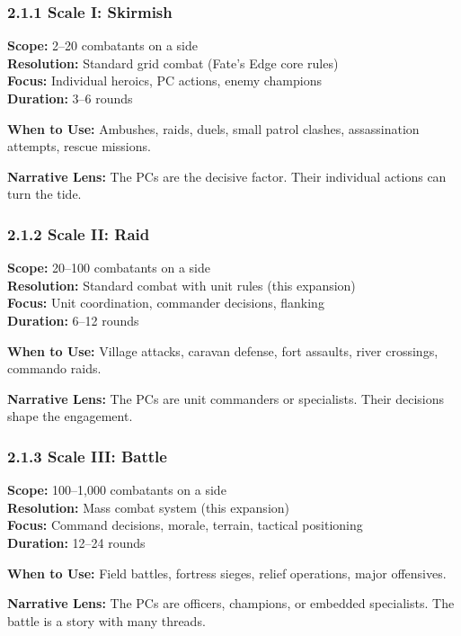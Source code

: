 \documentclass[11pt]{article}
\begin{document}
\subsubsection{2.1.1 Scale I: Skirmish}

\textbf{Scope:} 2–20 combatants on a side\\
\textbf{Resolution:} Standard grid combat (Fate's Edge core rules)\\
\textbf{Focus:} Individual heroics, PC actions, enemy champions\\
\textbf{Duration:} 3–6 rounds

\textbf{When to Use:} Ambushes, raids, duels, small patrol clashes, assassination attempts, rescue missions.

\textbf{Narrative Lens:} The PCs are the decisive factor. Their individual actions can turn the tide.

\subsubsection{2.1.2 Scale II: Raid}

\textbf{Scope:} 20–100 combatants on a side\\
\textbf{Resolution:} Standard combat with unit rules (this expansion)\\
\textbf{Focus:} Unit coordination, commander decisions, flanking\\
\textbf{Duration:} 6–12 rounds

\textbf{When to Use:} Village attacks, caravan defense, fort assaults, river crossings, commando raids.

\textbf{Narrative Lens:} The PCs are unit commanders or specialists. Their decisions shape the engagement.

\subsubsection{2.1.3 Scale III: Battle}

\textbf{Scope:} 100–1,000 combatants on a side\\
\textbf{Resolution:} Mass combat system (this expansion)\\
\textbf{Focus:} Command decisions, morale, terrain, tactical positioning\\
\textbf{Duration:} 12–24 rounds

\textbf{When to Use:} Field battles, fortress sieges, relief operations, major offensives.

\textbf{Narrative Lens:} The PCs are officers, champions, or embedded specialists. The battle is a story with many threads.
\end{document}
